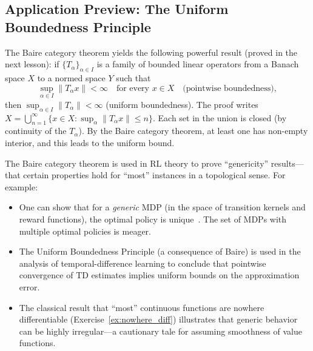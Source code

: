 \documentclass[11pt,a4paper]{article}
\begin{document}
\subsection{Application Preview: The Uniform Boundedness Principle}

\begin{remark}
\label{rem:ubp_preview}
The Baire category theorem yields the following powerful result (proved in
the next lesson): if $\{T_\alpha\}_{\alpha \in I}$ is a family of bounded
linear operators from a Banach space $X$ to a normed space $Y$ such that
\[
\sup_{\alpha \in I} \|T_\alpha x\| < \infty
\quad \text{for every } x \in X
\quad \text{(pointwise boundedness)},
\]
then $\sup_{\alpha \in I} \|T_\alpha\| < \infty$ (uniform boundedness).
The proof writes $X = \bigcup_{n=1}^\infty \{x \in X :
\sup_\alpha \|T_\alpha x\| \le n\}$. Each set in the union is closed (by
continuity of the $T_\alpha$). By the Baire category theorem, at least one
has non-empty interior, and this leads to the uniform bound.
\end{remark}

\begin{rlconnection}[title={Baire Category and Genericity in RL}]
The Baire category theorem is used in RL theory to prove ``genericity''
results---that certain properties hold for ``most'' instances in a
topological sense. For example:
\begin{itemize}[nosep]
    \item One can show that for a \emph{generic} MDP (in the space of
          transition kernels and reward functions), the optimal policy is
          unique~\cite{puterman2014}. The set of MDPs with multiple optimal
          policies is meager.
    \item The Uniform Boundedness Principle (a consequence of Baire) is used
          in the analysis of temporal-difference learning to conclude that
          pointwise convergence of TD estimates implies uniform bounds on the
          approximation error.
    \item The classical result that ``most'' continuous functions are nowhere
          differentiable (Exercise~\ref{ex:nowhere_diff}) illustrates that
          generic behavior can be highly irregular---a cautionary tale for
          assuming smoothness of value functions.
\end{itemize}
\end{rlconnection}

\end{document}
